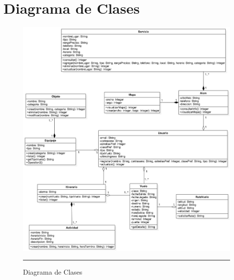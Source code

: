 \section{Diagrama de Clases}

\begin{figure}[htbp]
	\centering
		\includegraphics[width=1\textwidth]{Figuras/diagramaClasesMovil.png}
		\rule{30em}{0.5pt}
	\caption[Diagrama de Clases]{Diagrama de Clases}
	\label{fig:diagramaClases}
\end{figure}